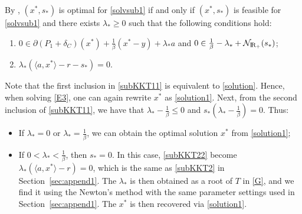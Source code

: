 \documentclass[10pt]{article}
\numberwithin{equation}{section}
\def\R{{\rm I\!R}}
\begin{document}
By \cite[Corollary~28.2.1, Theorem~28.3]{Ro70}, $(x^*, s_*)$ is optimal for \eqref{solvsub1} if and only if $(x^*, s_*)$ is feasible for \eqref{solvsub1} and there exists $\lambda_*\ge 0$ such that the following conditions hold:
\begin{enumerate}[{\rm (A)}]
  \item\label{subKKT11}  $0\in\partial (P_1 + \delta_{C})(x^*) + \frac{1}{\beta}(x^* - y) + \lambda_*a $ and $0\in \frac{1}{\beta} - \lambda_* + \mathcal{N}_{\R_+}(s_*)$;
  \item\label{subKKT22}  $\lambda_*(\langle a, x^*\rangle - r - s_*)=0$.
\end{enumerate}
Note that the first inclusion in \eqref{subKKT11} is equivalent to \eqref{solution}. Hence, when solving \eqref{E3}, one can again rewrite $x^*$ as \eqref{solution1}. Next, from the second inclusion of \eqref{subKKT11}, we have that $\lambda_* - \frac{1}{\beta} \leq 0$ and $s_*(\lambda_* - \frac{1}{\beta}) = 0$. Thus:
\begin{itemize}
  \item If $\lambda_* = 0$ or $\lambda_* = \frac{1}{\beta}$, {\color{blue} we }can obtain the optimal solution $x^*$ from \eqref{solution1};
  \item If $0< \lambda_* < \frac{1}{\beta}$, then $s_* = 0$. In this case, \eqref{subKKT22} become $\lambda_*(\langle a, x^*\rangle - r)=0$, which is the same as \eqref{subKKT2} in Section~\ref{sec:append1}. The $\lambda_*$ is then obtained as a root of $T$ in \eqref{G}, and we find it using the Newton's method with the same parameter settings used in Section~\ref{sec:append1}. The $x^*$ is then recovered via \eqref{solution1}.
\end{itemize}
\end{document}
